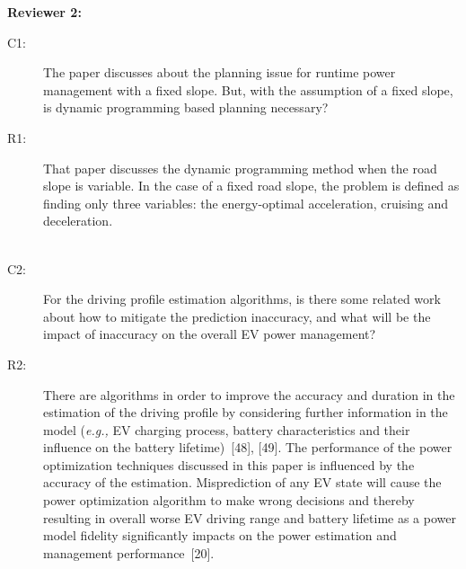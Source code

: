\documentclass[onecolumn]{IEEEconf}
\begin{document}
\textbf{Reviewer 2:}
\begin{description}
\item [C1: ] The paper discusses about the planning issue for runtime power management with a fixed slope. But, with the assumption of a fixed slope, is dynamic programming based planning necessary?
\item [R1: ] That paper discusses the dynamic programming method when the road slope is variable. In the case of a fixed road slope, the problem is defined as finding only three variables: the energy-optimal acceleration, cruising and deceleration.\\
~\\

\item [C2: ] For the driving profile estimation algorithms, is there some related work about how to mitigate the prediction inaccuracy, and what will be the impact of inaccuracy on the overall EV power management?
\item [R2: ] 
There are algorithms in order to improve the accuracy and duration in the estimation of the driving profile by considering further information in the model (\textit{e.g.,} EV charging process, battery characteristics and their influence on the battery lifetime)~[48], [49]. The performance of the power optimization techniques discussed in this paper is influenced by the accuracy of the estimation. 
Misprediction of any EV state will cause the power optimization algorithm to make wrong decisions and thereby resulting in overall worse EV driving range and battery lifetime as a power model fidelity significantly impacts on the power estimation and management performance~[20].




\end{description}
\end{document}
